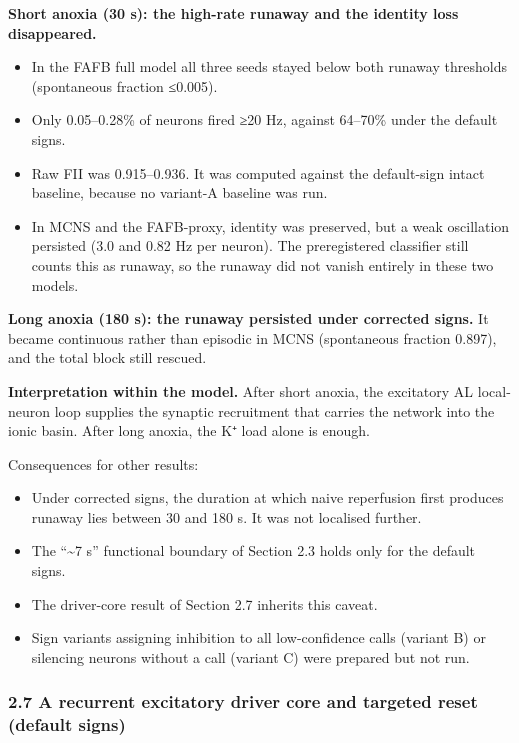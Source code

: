 \documentclass[11pt]{article}
\providecommand{\tightlist}{\setlength{\itemsep}{0pt}\setlength{\parskip}{0pt}}
\begin{document}
\textbf{Short anoxia (30 s): the high-rate runaway and the identity loss disappeared.}

\begin{itemize}
\tightlist
\item
  In the FAFB full model all three seeds stayed below both runaway thresholds (spontaneous fraction ≤0.005).
\item
  Only 0.05--0.28\% of neurons fired ≥20 Hz, against 64--70\% under the default signs.
\item
  Raw FII was 0.915--0.936. It was computed against the default-sign intact baseline, because no variant-A baseline was run.
\item
  In MCNS and the FAFB-proxy, identity was preserved, but a weak oscillation persisted (3.0 and 0.82 Hz per neuron). The preregistered classifier still counts this as runaway, so the runaway did not vanish entirely in these two models.
\end{itemize}

\textbf{Long anoxia (180 s): the runaway persisted under corrected signs.} It became continuous rather than episodic in MCNS (spontaneous fraction 0.897), and the total block still rescued.

\textbf{Interpretation within the model.} After short anoxia, the excitatory AL local-neuron loop supplies the synaptic recruitment that carries the network into the ionic basin. After long anoxia, the K⁺ load alone is enough.

Consequences for other results:

\begin{itemize}
\tightlist
\item
  Under corrected signs, the duration at which naive reperfusion first produces runaway lies between 30 and 180 s. It was not localised further.
\item
  The ``\textasciitilde7 s'' functional boundary of Section 2.3 holds only for the default signs.
\item
  The driver-core result of Section 2.7 inherits this caveat.
\item
  Sign variants assigning inhibition to all low-confidence calls (variant B) or silencing neurons without a call (variant C) were prepared but not run.
\end{itemize}

\subsubsection{2.7 A recurrent excitatory driver core and targeted reset (default signs)}\label{a-recurrent-excitatory-driver-core-and-targeted-reset-default-signs}
\end{document}
